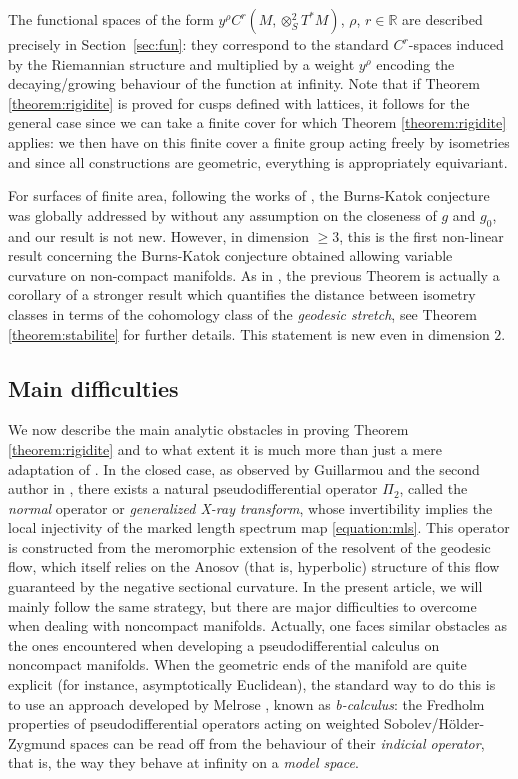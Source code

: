 \documentclass[JEP,XML,SOM,Unicode,NoFloatCountersInSection]{cedram}
\newcommand{\R}{\mathbb{R}}
\theoremstyle{plain}
\theoremstyle{definition}
\begin{document}
The functional spaces of the form $y^\rho C^r(M,\otimes^2_S T^*M)$, $\rho$, $r \in \R$ are described precisely in Section~\ref{sec:fun}: they correspond to the standard $C^r$-spaces induced by the Riemannian structure and multiplied by a weight $y^\rho$ encoding the decaying/growing behaviour of the function at infinity. Note that if Theorem \ref{theorem:rigidite} is proved for cusps defined with lattices, it follows for the general case since we can take a finite cover for which Theorem \ref{theorem:rigidite} applies: we then have on this finite cover a finite group acting freely by isometries and since all constructions are geometric, everything is appropriately equivariant.

For surfaces of finite area, following the works of \cite{Croke-90, Otal-90}, the Burns-Katok conjecture was globally addressed by \cite{Cao-95} without any assumption on the closeness of $g$ and $g_0$, and our result is not new. However, in dimension $\geq 3$, this is the first non-linear result concerning the Burns-Katok conjecture obtained allowing variable curvature on non-compact manifolds. As in \cite{Guillarmou-Lefeuvre-18}, the previous Theorem is actually a corollary of a stronger result which quantifies the distance between isometry classes in terms of the cohomology class of the \emph{geodesic stretch}, see Theorem \ref{theorem:stabilite} for further details. This statement is new even in dimension $2$.

\subsection{Main difficulties} We now describe the main analytic obstacles in proving Theorem \ref{theorem:rigidite} and to what extent it is much more than just a mere adaptation of \cite{Guillarmou-Lefeuvre-18}. In the closed case, as observed by Guillarmou and the second author in \cite{Guillarmou-17-1, Guillarmou-Lefeuvre-18}, there exists a natural pseudodifferential operator $\Pi_2$, called the \emph{normal} operator or \emph{generalized X-ray transform}, whose invertibility implies the local injectivity of the marked length spectrum map \eqref{equation:mls}. This operator is constructed from the meromorphic extension of the resolvent of the geodesic flow, which itself relies on the Anosov (that is, hyperbolic) structure of this flow guaranteed by the negative sectional curvature. In the present article, we will mainly follow the same strategy, but there are major difficulties to overcome when dealing with noncompact manifolds. Actually, one faces similar obstacles as the ones encountered when developing a pseudodifferential calculus on noncompact manifolds. When the geometric ends of the manifold are quite explicit (for instance, asymptotically Euclidean), the standard way to do this is to use an approach developed by Melrose \cite{Melrose-APS-93}, known as \emph{b-calculus}: the Fredholm properties of pseudodifferential operators acting on weighted Sobolev/Hölder-Zygmund spaces can be read off from the behaviour of their \emph{indicial operator}, that is, the way they behave at infinity on a \emph{model space}.
\end{document}
